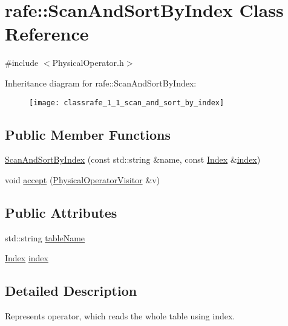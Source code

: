 \hypertarget{classrafe_1_1_scan_and_sort_by_index}{\section{rafe\+:\+:Scan\+And\+Sort\+By\+Index Class Reference}
\label{classrafe_1_1_scan_and_sort_by_index}
}


{\ttfamily \#include $<$Physical\+Operator.\+h$>$}

Inheritance diagram for rafe\+:\+:Scan\+And\+Sort\+By\+Index\+:\begin{figure}[H]
\begin{center}
\leavevmode
\texttt{[image: classrafe\_1\_1\_scan\_and\_sort\_by\_index]}
\end{center}
\end{figure}
\subsection*{Public Member Functions}
\begin{DoxyCompactItemize}
\item 
\hyperlink{classrafe_1_1_scan_and_sort_by_index_a375abca591223d619fe86074e4e72d47}{Scan\+And\+Sort\+By\+Index} (const std\+::string \&name, const \hyperlink{classrafe_1_1_index}{Index} \&\hyperlink{classrafe_1_1_scan_and_sort_by_index_a098de983bcb2456f2b904bea0dbd2bb8}{index})
\item 
void \hyperlink{classrafe_1_1_scan_and_sort_by_index_aabb5d931b679a14bde40a1928ac10a52}{accept} (\hyperlink{classrafe_1_1_physical_operator_visitor}{Physical\+Operator\+Visitor} \&v)
\end{DoxyCompactItemize}
\subsection*{Public Attributes}
\begin{DoxyCompactItemize}
\item 
std\+::string \hyperlink{classrafe_1_1_scan_and_sort_by_index_abdcff33645fc0806646167276cc3c46f}{table\+Name}
\item 
\hyperlink{classrafe_1_1_index}{Index} \hyperlink{classrafe_1_1_scan_and_sort_by_index_a098de983bcb2456f2b904bea0dbd2bb8}{index}
\end{DoxyCompactItemize}


\subsection{Detailed Description}
Represents operator, which reads the whole table using index. 

